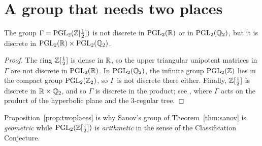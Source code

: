 \section{A group that needs two places}\label{sec:arithmetic}

\begin{proposition}\label{prop:twoplaces}
The group $\Gamma = \mathrm{PGL}_2(\mathbb{Z}[\frac12])$ is not discrete in $\mathrm{PGL}_2(\mathbb{R})$ or in
$\mathrm{PGL}_2(\mathbb{Q}_2)$, but it is discrete in $\mathrm{PGL}_2(\mathbb{R}) \times \mathrm{PGL}_2(\mathbb{Q}_2)$.
\end{proposition}

\begin{proof}
The ring $\mathbb{Z}[\frac12]$ is dense in $\mathbb{R}$, so the upper triangular unipotent
matrices in $\Gamma$ are not discrete in $\mathrm{PGL}_2(\mathbb{R})$. In $\mathrm{PGL}_2(\mathbb{Q}_2)$, the
infinite group $\mathrm{PGL}_2(\mathbb{Z})$ lies in the compact group $\mathrm{PGL}_2(\mathbb{Z}_2)$, so
$\Gamma$ is not discrete there either. Finally, $\mathbb{Z}[\frac12]$ is discrete in
$\mathbb{R} \times \mathbb{Q}_2$, and so $\Gamma$ is discrete in the product; see
\cite[Chapter~II]{serre}, where $\Gamma$ acts on the product of the hyperbolic
plane and the $3$-regular tree.
\end{proof}

\begin{remark}
Proposition~\ref{prop:twoplaces} is why Sanov's group of
Theorem~\ref{thm:sanov} is \emph{geometric} while $\mathrm{PGL}_2(\mathbb{Z}[\frac12])$ is
\emph{arithmetic} in the sense of the Classification Conjecture.
\end{remark}
